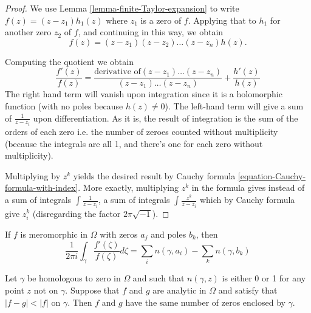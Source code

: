 \begin{proof}
We use Lemma \ref{lemma-finite-Taylor-expansion} to write
$f(z)=(z-z_1)h_1(z)$ where $z_1$ is a zero of $f$. 
Applying that to $h_1$ for another zero  $z_2$ of $f$,
and continuing in this way, we obtain 
\begin{equation}
\label{equation-factor-zeroes}
f(z)=(z-z_1)(z-z_2)\ldots(z-z_n)h(z).
\end{equation}

\noindent
Computing the quotient we obtain
$$
\frac{f'(z)}{f(z)}=\frac{\text{derivative of
$(z-z_1)\ldots(z-z_n)$}}{(z-z_1)\ldots(z-z_n)}+\frac{h'(z)}{h(z)}
$$
The right hand term will vanish upon integration since it is a holomorphic
function (with no poles because $h(z)\neq 0$). The left-hand term will give a
sum of $\frac{1}{z-z_i}$ upon differentiation. As it is, the result of
integration is the sum of the orders of each zero i.e. the number of zeroes
counted without multiplicity 
(because the integrals are all 1, and there's one for each zero without
multiplicity).

Multiplying by $z^k$ yields the desired result by Cauchy formula
\ref{equation-Cauchy-formula-with-index}. More exactly,
multiplying $z^k$ in the formula gives instead of a sum
of integrals $\int \frac{1}{z-z_i}$, a sum of integrals
$\int\frac{z^k}{z-z_i}$ which by Cauchy formula give $z_i^k$
(disregarding the factor $2\pi\sqrt{-1}$).
\end{proof}

\begin{theorem}
\label{theorem-argument-principle-and-Rouche-theorem}
\begin{reference}
\cite[Chapter 5, Theorem 18]{ahl}
\end{reference}
If $f$ is meromorphic in $\Omega$ with zeros $a_j$ and poles $b_k$, then
\begin{equation}
\label{equation-argument-principle}
\frac{1}{2\pi i}\int_\gamma\frac{f'(\zeta)}{f(\zeta)}d\zeta
=\sum_{i}n(\gamma,a_i)-\sum_{k}n(\gamma,b_k)
\end{equation}
\end{theorem}

\begin{lemma}
\label{lemma-Rouche-theorem}
\begin{reference}
\cite[Chapter 5, Corollary, p. 153]{ahl}
\end{reference}
Let $\gamma$ be homologous to zero in $\Omega$ and such that $n(\gamma,z)$ is
either 0 or 1 for any point $z$ not on $\gamma$. Suppose that $f$ and $g$ are
analytic in $\Omega$ and satisfy that $|f-g|<|f|$ on $\gamma$. Then $f$ and $g$
have the same number of zeros enclosed by $\gamma$.
\end{lemma}

